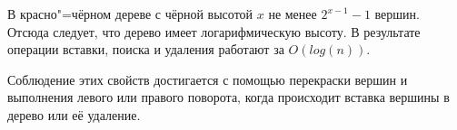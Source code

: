 \documentclass[otchet]{../SCWorks}
\begin{document}
В красно"=чёрном дереве с чёрной высотой $x$ не менее $2^{x - 1} - 1$ вершин. Отсюда следует, что дерево имеет логарифмическую высоту. В результате операции вставки, поиска и удаления работают за $O(log(n))$.

Соблюдение этих свойств достигается с помощью перекраски вершин и выполнения левого или правого поворота, когда происходит вставка вершины в дерево или её удаление.






\appendix
\end{document}
